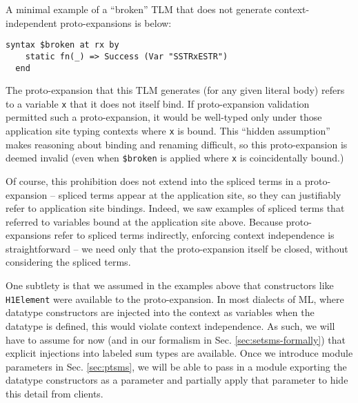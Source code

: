 \documentclass[acmsmall,10pt,review,anonymous]{acmart}\settopmatter{printfolios=true}
\newcommand{\li}[1]{\lstinline{#1}}
\begin{document}
A minimal example of a ``broken'' TLM that does not generate context-independent proto-expansions is below:
\begin{lstlisting}[numbers=none]
  syntax $broken at rx by
    static fn(_) => Success (Var "SSTRxESTR")
  end
\end{lstlisting}
The proto-expansion that this TLM generates (for any given literal body) refers to a variable \li{x} that it does not itself bind. If proto-expansion validation permitted such a proto-expansion, it would be well-typed only under those application site typing contexts where \li{x} is bound. This ``hidden assumption'' makes reasoning about binding and renaming difficult, so this proto-expansion is deemed invalid (even when \li{$broken} is applied where \li{x} is coincidentally bound.)

Of course, this prohibition does not extend into the spliced terms in a proto-expansion -- spliced terms appear at the application site, so they can justifiably refer to application site bindings. Indeed, we saw examples of spliced terms that referred to variables bound at the application site above. Because proto-expansions refer to spliced terms indirectly, enforcing context independence is straightforward -- we need only that the proto-expansion itself be closed, without considering the spliced terms.%

One subtlety is that we assumed in the examples above that constructors like \li{H1Element} were available to the proto-expansion. In most dialects of ML, where datatype constructors are injected into the context as variables when the datatype is defined, this would violate context independence. As such, we will have to assume for now (and in our formalism in Sec. \ref{sec:setsms-formally}) that explicit injections into labeled sum types are available. Once we introduce module parameters in Sec. \ref{sec:ptsms}, we will be able to pass in a module exporting the datatype constructors as a parameter and partially apply that parameter to hide this detail from clients.

\end{document}
